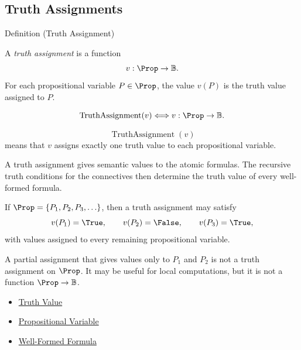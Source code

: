 \subsection*{Truth Assignments}
\label{subsec:truth-assignments-propositional-logic}

\begin{definitionbox}{Definition (Truth Assignment)}
\begin{definition}
\label{def:truth-assignment-propositional-logic}
A \emph{truth assignment} is a function
\[
v:\Prop\to\mathbb{B}.
\]
For each propositional variable \(P\in\Prop\), the value \(v(P)\) is the truth
value assigned to \(P\).
\end{definition}
\end{definitionbox}

\begin{remark*}
\[
\operatorname{TruthAssignment}(v)
\Longleftrightarrow
v:\Prop\to\mathbb{B}.
\]
\end{remark*}

\begin{remark*}
\[
\operatorname{TruthAssignment}(v)
\]
means that \(v\) assigns exactly one truth value to each propositional variable.
\end{remark*}

\begin{remark*}[Interpretation]
A truth assignment gives semantic values to the atomic formulas. The recursive
truth conditions for the connectives then determine the truth value of every
well-formed formula.
\end{remark*}

\begin{remark*}[Examples]
If \(\Prop=\{P_1,P_2,P_3,\ldots\}\), then a truth assignment may satisfy
\[
v(P_1)=\True,\qquad v(P_2)=\False,\qquad v(P_3)=\True,
\]
with values assigned to every remaining propositional variable.
\end{remark*}

\begin{remark*}
A partial assignment that gives values only to \(P_1\) and \(P_2\) is not a truth
assignment on \(\Prop\). It may be useful for local computations, but it is not a
function \(\Prop\to\mathbb{B}\).
\end{remark*}

\begin{dependencies}
\begin{itemize}
  \item \hyperref[def:truth-value-propositional-logic]{Truth Value}
  \item \hyperref[def:propositional-variable]{Propositional Variable}
  \item \hyperref[def:well-formed-formula]{Well-Formed Formula}
\end{itemize}
\end{dependencies}

